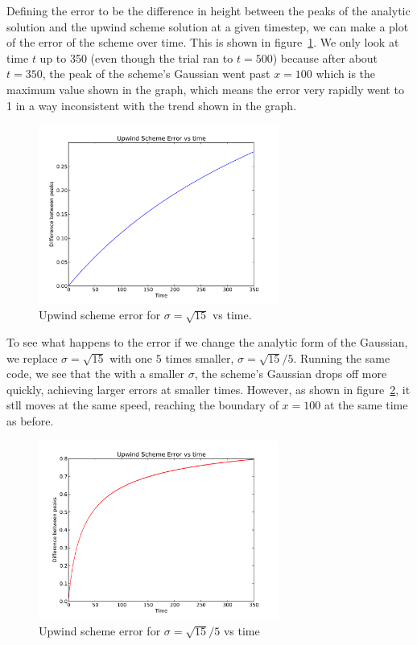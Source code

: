 \documentclass[11pt,letterpaper]{article}
\begin{document}
Defining the error to be the difference in height between the peaks of the analytic
solution and the upwind scheme solution at a given timestep, we can make a plot 
of the error of the scheme over time. This is shown in figure~\ref{fig:error1}. We only
look at time $t$ up to 350 (even though the trial ran to $t=500$) because after about
$t=350$, the peak of the scheme's Gaussian went past $x=100$ which is the maximum 
value shown in the graph, which means the error very rapidly went to 1 in a way 
inconsistent with the trend shown in the graph.

\begin{figure}[bth]
\centering
\includegraphics[width=0.7\textwidth]{error1.pdf}
\caption{Upwind scheme error for $\sigma = \sqrt{15}$ vs time.}
\label{fig:error1}
\end{figure}

To see what happens to the error if we change the analytic form of the Gaussian, we
replace $\sigma = \sqrt{15}$ with one $5$ times smaller, $\sigma = \sqrt{15}/5$. Running
the same code, we see that the with a smaller $\sigma$, the scheme's Gaussian drops
off more quickly, achieving larger errors at smaller times. However, as shown
in figure~\ref{fig:error2}, it stll moves at the same speed, reaching the 
boundary of $x = 100$ at the same time as before.

\begin{figure}[bth]
\centering
\includegraphics[width=0.7\textwidth]{error2.pdf}
\caption{Upwind scheme error for $\sigma = \sqrt{15}/5$ vs time}
\label{fig:error2}
\end{figure}
\end{document}
